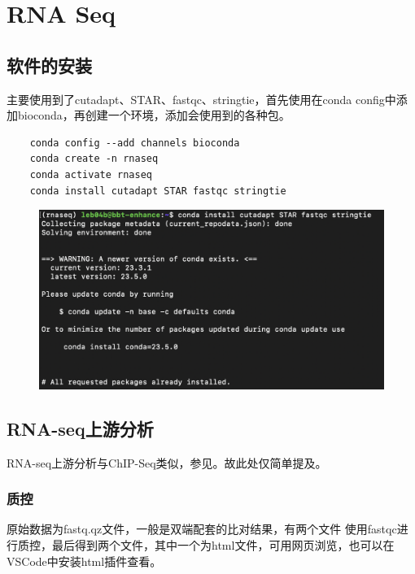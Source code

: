 \chapter{RNA Seq}

\section{软件的安装}
主要使用到了cutadapt、STAR、fastqc、stringtie，首先使用在conda config中添加bioconda，再创建一个环境，添加会使用到的各种包。
\begin{lstlisting}
    conda config --add channels bioconda
    conda create -n rnaseq
    conda activate rnaseq
    conda install cutadapt STAR fastqc stringtie
\end{lstlisting}

\begin{figure}[ht]
    \includegraphics[width=13cm]{image/rnaseq/package.PNG}
\end{figure}

\section{RNA-seq上游分析}
RNA-seq上游分析与ChIP-Seq类似，参见。故此处仅简单提及。

\subsection{质控}
原始数据为fastq.qz文件，一般是双端配套的比对结果，有两个文件
使用fastqc进行质控，最后得到两个文件，其中一个为html文件，可用网页浏览，也可以在VSCode中安装html插件查看。

